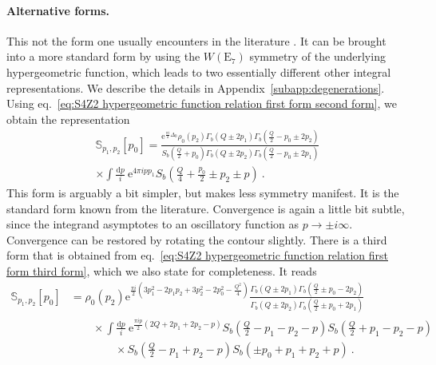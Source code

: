\documentclass[12pt,a4paper]{article}
\renewcommand\d{\text{d}}
\begin{document}
\paragraph{Alternative forms.} This not the form one usually encounters in the literature \cite{Teschner:2003at, Teschner:2013tqy}. It can be brought into a more standard form by using the $W(\mathrm{E}_7)$ symmetry of the underlying hypergeometric function, which leads to two essentially different other integral representations. We describe the details in Appendix~\ref{subapp:degenerations}. Using eq.~\eqref{eq:S4Z2 hypergeometric function relation first form second form}, we obtain the representation
\begin{multline}
\mathbb{S}_{p_1,p_2}[p_0]=\frac{\mathrm{e}^{\frac{\pi i}{2} \Delta_0} \rho_0(p_2)\Gamma_b(Q \pm 2p_1) \Gamma_b(\frac{Q}{2}-p_0 \pm 2p_2)}{S_b(\frac{Q}{2}+p_0)\Gamma_b(Q \pm 2p_2) \Gamma_b(\frac{Q}{2}-p_0 \pm 2p_1)} \\
\times \int \frac{\d p}{i} \ \mathrm{e}^{4\pi i p p_1} S_b(\tfrac{Q}{4}+\tfrac{p_0}{2}  \pm p_2 \pm p)\ . \label{eq:modular crossing kernel second form}
\end{multline}
This form is arguably a bit simpler, but makes less symmetry manifest. It is the standard form known from the literature. Convergence is again a little bit subtle, since the integrand asymptotes to an oscillatory function as $p \to \pm i \infty$. Convergence can be restored by rotating the contour slightly. There is a third form that is obtained from eq.~\eqref{eq:S4Z2 hypergeometric function relation first form third form}, which we also state for completeness. It reads
\begin{align}
    \mathbb{S}_{p_1,p_2}[p_0]&=\rho_0(p_2) \mathrm{e}^{\frac{\pi i}{2}(3p_1^2-2p_1p_2+3p_2^2-2p_0^2-\frac{Q^2}{4})} \frac{\Gamma_b(Q \pm 2p_1)\Gamma_b(\frac{Q}{2} \pm p_0-2p_2)}{\Gamma_b(Q \pm 2p_2) \Gamma_b(\frac{Q}{2} \pm p_0+2p_1)} \nonumber\\
    &\qquad\times \int \frac{\d p}{i}\ \mathrm{e}^{\frac{\pi i p}{2}(2Q+2p_1+2p_2-p)} S_b(\tfrac{Q}{2}- p_1-p_2-p)S_b(\tfrac{Q}{2}+ p_1-p_2-p)\nonumber\\
    &\qquad\qquad\times S_b(\tfrac{Q}{2}- p_1+p_2-p)S_b(\pm p_0+p_1+p_2+p)\ .\label{eq:modular crossing kernel third form}
\end{align}
\end{document}
